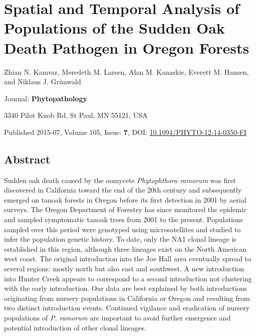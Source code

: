 \documentclass[double,12pt]{beavtex}
\begin{document}
  \chapter{Spatial and Temporal Analysis of Populations of the Sudden Oak
  Death Pathogen in Oregon
  Forests}\label{spatial-and-temporal-analysis-of-populations-of-the-sudden-oak-death-pathogen-in-oregon-forests}
  
  \singlespacing
  
  \begin{center}
  Zhian N. Kamvar, Meredeth M. Larsen, Alan M. Kanaskie, Everett M.
  Hansen, and Niklaus J. Grünwald
  
  
  
  \end{center}\vspace*{\fill}
  
  Journal: \textbf{Phytopathology}
  
  3340 Pilot Knob Rd, St Paul, MN 55121, USA
  
  Published 2015-07, Volume 105, Issue: \textbf{7}, DOI:
  \href{http://dx.doi.org/10.1094/PHYTO-12-14-0350-FI}{10.1094/PHYTO-12-14-0350-FI}
  
  \doublespacing
  \newpage
  
  \section{Abstract}\label{abstract-2}
  
  Sudden oak death caused by the oomycete \emph{Phytophthora ramorum} was
  first discovered in California toward the end of the 20th century and
  subsequently emerged on tanoak forests in Oregon before its first
  detection in 2001 by aerial surveys. The Oregon Department of Forestry
  has since monitored the epidemic and sampled symptomatic tanoak trees
  from 2001 to the present. Populations sampled over this period were
  genotyped using microsatellites and studied to infer the population
  genetic history. To date, only the NA1 clonal lineage is established in
  this region, although three lineages exist on the North American west
  coast. The original introduction into the Joe Hall area eventually
  spread to several regions: mostly north but also east and southwest. A
  new introduction into Hunter Creek appears to correspond to a second
  introduction not clustering with the early introduction. Our data are
  best explained by both introductions originating from nursery
  populations in California or Oregon and resulting from two distinct
  introduction events. Continued vigilance and eradication of nursery
  populations of \emph{P. ramorum} are important to avoid further
  emergence and potential introduction of other clonal lineages.
  
\end{document}
